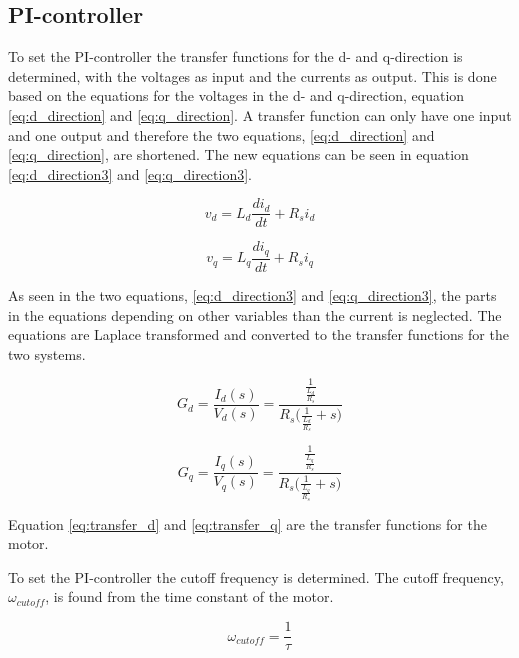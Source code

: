 \subsection{PI-controller}

To set the PI-controller the transfer functions for the d- and q-direction is determined, with the voltages as input and the currents as output. This is done based on the equations for the voltages in the d- and q-direction, equation \ref{eq:d_direction} and \ref{eq:q_direction}.
A transfer function can only have one input and one output and therefore the two equations, \ref{eq:d_direction} and \ref{eq:q_direction}, are shortened. The new equations can be seen in equation \ref{eq:d_direction3} and \ref{eq:q_direction3}.

\begin{equation}
    \label{eq:d_direction3}
    v_d = L_d \frac{d i_d}{dt} + R_s i_d
\end{equation}

\begin{equation}
    \label{eq:q_direction3}
    v_q = L_q \frac{d i_q}{dt} + R_s i_q
\end{equation}

As seen in the two equations, \ref{eq:d_direction3} and \ref{eq:q_direction3}, the parts in the equations depending on other variables than the current is neglected. 
The equations are Laplace transformed and converted to the transfer functions for the two systems.

\begin{equation}
    \label{eq:transfer_d}
    G_d = \frac{I_d(s)}{V_d(s)} = \frac{ \frac{1}{ \frac{L_d}{R_s} } }{ R_s \bigg(\frac{1}{ \frac{L_d}{R_s} } + s \bigg) }
\end{equation}

\begin{equation}
    \label{eq:transfer_q}
    G_q = \frac{I_q(s)}{V_q(s)} = \frac{ \frac{1}{ \frac{L_q}{R_s} } }{ R_s \bigg(\frac{1}{ \frac{L_q}{R_s} } + s \bigg) }
\end{equation}

Equation \ref{eq:transfer_d} and \ref{eq:transfer_q} are the transfer functions for the motor.

To set the PI-controller the cutoff frequency is determined. The cutoff frequency, $\omega_{cutoff}$, is found from the time constant of the motor.

\begin{equation}
    \omega_{cutoff} = \frac{1}{\tau}
\end{equation}

